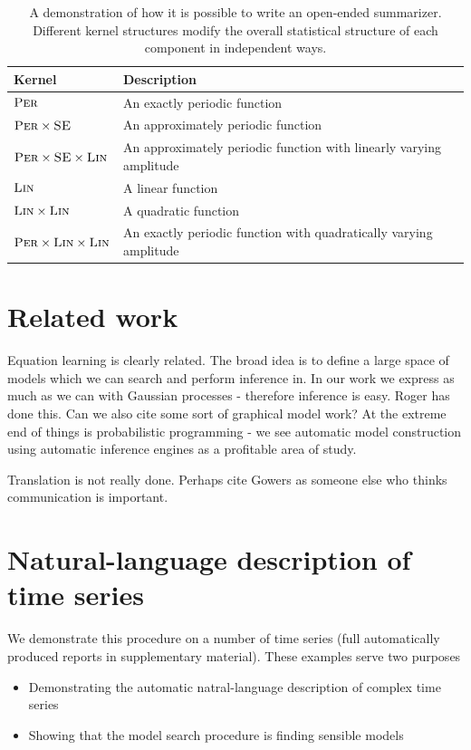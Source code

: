 \documentclass{article}
\begin{document}
\begin{table}[ht]
\begin{tabular}{l|l}
Kernel & Description \\
\midrule
${\textsc{Per}}$ & An exactly periodic function \\
${\textsc{Per}} \times {\textsc{SE}}$ & An approximately periodic function \\
${\textsc{Per}} \times {\textsc{SE}} \times {\textsc{Lin}}$ & An approximately periodic function with linearly varying amplitude \\
${\textsc{Lin}}$ & A linear function \\
${\textsc{Lin}} \times {\textsc{Lin}}$ & A quadratic function \\
${\textsc{Per}} \times {\textsc{Lin}} \times {\textsc{Lin}}$ & An exactly periodic function with quadratically varying amplitude\\
\end{tabular}
\caption{A demonstration of how it is possible to write an open-ended summarizer.  Different kernel structures modify the overall statistical structure of each component in independent ways.}
\label{table:descriptions}
\end{table}

\section{Related work}

Equation learning is clearly related.
The broad idea is to define a large space of models which we can search and perform inference in.
In our work we express as much as we can with Gaussian processes - therefore inference is easy.
Roger has done this.
Can we also cite some sort of graphical model work?
At the extreme end of things is probabilistic programming - we see automatic model construction using automatic inference engines as a profitable area of study.

Translation is not really done.
Perhaps cite Gowers as someone else who thinks communication is important.

\section{Natural-language description of time series}
\label{sec:examples}

We demonstrate this procedure on a number of time series (full automatically produced reports in supplementary material).
These examples serve two purposes
\begin{itemize}
  \item Demonstrating the automatic natral-language description of complex time series
  \item Showing that the model search procedure is finding sensible models
\end{itemize}
\end{document}
